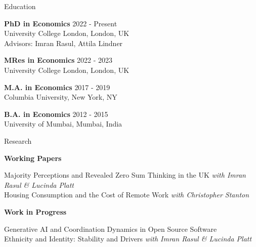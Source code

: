 \documentclass{resume} %
\begin{document}

\begin{rSection}{Education}

{\bf PhD in Economics}  \hfill {2022 - Present} \\
University College London, London, UK \smallskip \\
Advisors: Imran Rasul, Attila Lindner

{\bf MRes in Economics}  \hfill {2022 - 2023} \\
University College London, London, UK

{\bf M.A. in Economics}  \hfill {2017 - 2019} \\
Columbia University, New York, NY


{\bf B.A. in Economics}  \hfill {2012 - 2015} \\
University of Mumbai, Mumbai, India

\end{rSection}

\begin{rSection}{Research}

\textbf{Working Papers}

Majority Perceptions and Revealed Zero Sum Thinking in the UK \hfill \textit{with Imran Rasul \& Lucinda Platt} \\ [1em]
Housing Consumption and the Cost of Remote Work \hfill \textit{with Christopher Stanton}

\textbf{Work in Progress}

Generative AI and Coordination Dynamics in Open Source Software \\ [1em]
Ethnicity and Identity: Stability and Drivers \hfill \textit{with Imran Rasul \& Lucinda Platt}

\end{rSection} 
\end{document}
